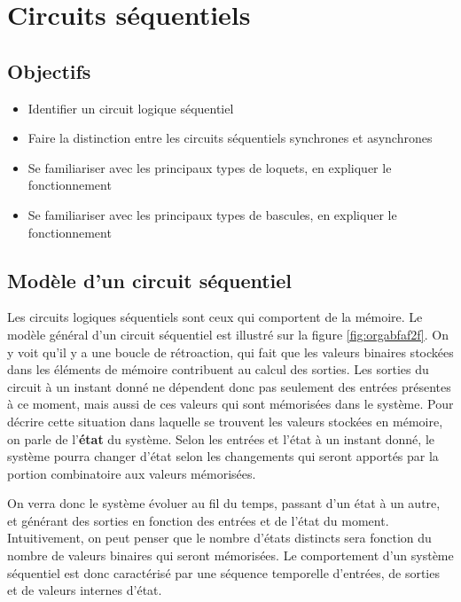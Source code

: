 \documentclass[11pt]{article}
\begin{document}
\section{Circuits séquentiels}
\label{sec:org2a6c2e6}

\subsection{Objectifs}
\label{sec:orgb666956}
\begin{itemize}
\item Identifier un circuit logique séquentiel
\item Faire la distinction entre les circuits séquentiels synchrones et asynchrones
\item Se familiariser avec les principaux types de loquets, en expliquer
le fonctionnement
\item Se familiariser avec les principaux types de bascules, en expliquer
le fonctionnement
\end{itemize}

\subsection{Modèle d'un circuit séquentiel}
\label{sec:org065f6b6}

Les circuits logiques séquentiels sont ceux qui comportent de la
mémoire. Le modèle général d'un circuit séquentiel est illustré sur la
figure \ref{fig:orgabfaf2f}. On y voit qu'il y a une boucle de rétroaction,
qui fait que les valeurs binaires stockées dans les éléments de
mémoire contribuent au calcul des sorties. Les sorties du circuit à un
instant donné ne dépendent donc pas seulement des entrées présentes à
ce moment, mais aussi de ces valeurs qui sont mémorisées dans le
système. Pour décrire cette situation dans laquelle se trouvent les
valeurs stockées en mémoire, on parle de l'\textbf{état} du système. Selon
les entrées et l'état à un instant donné, le système pourra changer
d'état selon les changements qui seront apportés par la portion
combinatoire aux valeurs mémorisées.

On verra donc le système évoluer au fil du temps, passant d'un état à
un autre, et générant des sorties en fonction des entrées et de l'état
du moment. Intuitivement, on peut penser que le nombre d'états
distincts sera fonction du nombre de valeurs binaires qui seront
mémorisées. Le comportement d'un système séquentiel est donc
caractérisé par une séquence temporelle d'entrées, de sorties et de
valeurs internes d'état.
\end{document}
